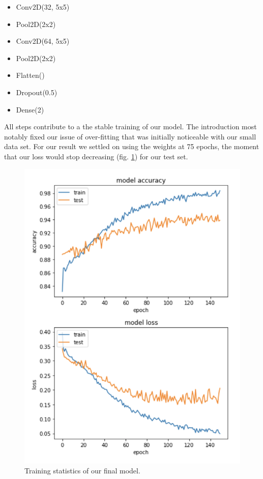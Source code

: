 \begin{itemize}
    \item Conv2D(32, 5x5)
    \item Pool2D(2x2)
    \item Conv2D(64, 5x5)
    \item Pool2D(2x2)
    \item Flatten()
    \item Dropout(0.5)
    \item Dense(2)
\end{itemize}

All steps contribute to a the stable training of our model. The introduction most notably fixed our issue of over-fitting that was initially noticeable with our small data set. For our result we settled on using the weights at 75 epochs, the moment that our loss would stop decreasing (fig. \ref{cnn-final}) for our test set. 

\begin{figure}[ht]
\begin{center}
\centerline{\includegraphics[width=\columnwidth]{images/cnn-training-final.png}}
\caption{Training statistics of our final model.}
\label{cnn-final}
\end{center}
\end{figure}

